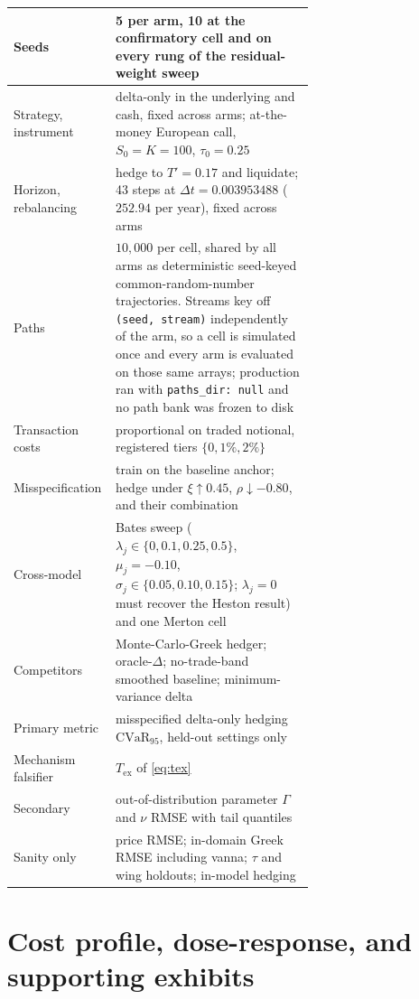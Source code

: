 \documentclass{article}
\begin{document}
\begin{table}[h]
\begin{tabular}{@{}lp{0.66\linewidth}@{}}
Seeds & 5 per arm, 10 at the confirmatory cell and on every rung of the residual-weight sweep \\
\midrule
Strategy, instrument & delta-only in the underlying and cash, fixed across arms; at-the-money European call, $S_0{=}K{=}100$, $\tau_0{=}0.25$ \\
Horizon, rebalancing & hedge to $T'{=}0.17$ and liquidate; 43 steps at $\Delta t=0.003953488$ ($252.94$ per year), fixed across arms \\
Paths & $10{,}000$ per cell, shared by all arms as deterministic seed-keyed common-random-number trajectories. Streams key off \texttt{(seed, stream)} independently of the arm, so a cell is simulated once and every arm is evaluated on those same arrays; production ran with \texttt{paths\_dir: null} and no path bank was frozen to disk \\
Transaction costs & proportional on traded notional, registered tiers $\{0, 1\%, 2\%\}$ \\
Misspecification & train on the baseline anchor; hedge under $\xi{\uparrow}0.45$, $\rho{\downarrow}{-}0.80$, and their combination \\
Cross-model & Bates sweep ($\lambda_j\in\{0,0.1,0.25,0.5\}$, $\mu_j{=}-0.10$, $\sigma_j\in\{0.05,0.10,0.15\}$; $\lambda_j{=}0$ must recover the Heston result) and one Merton cell \\
Competitors & Monte-Carlo-Greek hedger; oracle-$\Delta$; no-trade-band smoothed baseline; minimum-variance delta \\
\midrule
Primary metric & misspecified delta-only hedging $\mathrm{CVaR}_{95}$, held-out settings only \\
Mechanism falsifier & $T_{\mathrm{ex}}$ of \eqref{eq:tex} \\
Secondary & out-of-distribution parameter $\Gamma$ and $\nu$ RMSE with tail quantiles \\
Sanity only & price RMSE; in-domain Greek RMSE including vanna; $\tau$ and wing holdouts; in-model hedging \\
\bottomrule
\end{tabular}
\end{table}

\section{Cost profile, dose-response, and supporting exhibits}
\label{app:exhibits}
\end{document}

